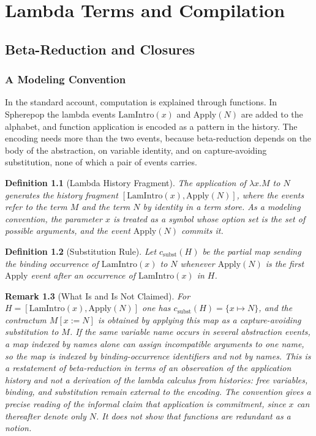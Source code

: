 \documentclass[12pt,oneside,openany]{book}
\theoremstyle{spherepop}
\newtheorem{definition}{Definition}[chapter]
\theoremstyle{remarkstyle}
\newtheorem{remark}[definition]{Remark}
\begin{document}
\part{Lambda Terms and Compilation}

\chapter{Beta-Reduction and Closures}
\label{ch:lambda}

\section{A Modeling Convention}

In the standard account, computation is explained through functions. In Spherepop the lambda events $\mathrm{LamIntro}(x)$ and $\mathrm{Apply}(N)$ are added to the alphabet, and function application is encoded as a pattern in the history. The encoding needs more than the two events, because beta-reduction depends on the body of the abstraction, on variable identity, and on capture-avoiding substitution, none of which a pair of events carries.

\begin{definition}[Lambda History Fragment]
The application of $\lambda x.M$ to $N$ generates the history fragment $[\mathrm{LamIntro}(x),\mathrm{Apply}(N)]$, where the events refer to the term $M$ and the term $N$ by identity in a term store. As a modeling convention, the parameter $x$ is treated as a symbol whose option set is the set of possible arguments, and the event $\mathrm{Apply}(N)$ commits it.
\end{definition}

\begin{definition}[Substitution Rule]
Let $c_{\mathrm{subst}}(H)$ be the partial map sending the binding occurrence of $\mathrm{LamIntro}(x)$ to $N$ whenever $\mathrm{Apply}(N)$ is the first $\mathrm{Apply}$ event after an occurrence of $\mathrm{LamIntro}(x)$ in $H$.
\end{definition}

\begin{remark}[What Is and Is Not Claimed]
For $H=[\mathrm{LamIntro}(x),\mathrm{Apply}(N)]$ one has $c_{\mathrm{subst}}(H)=\{x\mapsto N\}$, and the contractum $M[x:=N]$ is obtained by applying this map as a capture-avoiding substitution to $M$. If the same variable name occurs in several abstraction events, a map indexed by names alone can assign incompatible arguments to one name, so the map is indexed by binding-occurrence identifiers and not by names. This is a restatement of beta-reduction in terms of an observation of the application history and not a derivation of the lambda calculus from histories: free variables, binding, and substitution remain external to the encoding. The convention gives a precise reading of the informal claim that application is commitment, since $x$ can thereafter denote only $N$. It does not show that functions are redundant as a notion.
\end{remark}
\end{document}
